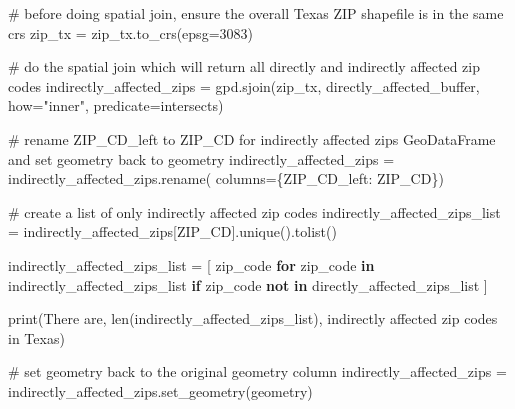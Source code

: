 \documentclass[
  letterpaper,
  DIV=11,
  numbers=noendperiod]{scrartcl}
\newenvironment{Shaded}{\begin{snugshade}}{\end{snugshade}}
\newcommand{\BuiltInTok}[1]{\textcolor[rgb]{0.00,0.23,0.31}{#1}}
\newcommand{\CommentTok}[1]{\textcolor[rgb]{0.37,0.37,0.37}{#1}}
\newcommand{\ControlFlowTok}[1]{\textcolor[rgb]{0.00,0.23,0.31}{\textbf{#1}}}
\newcommand{\DecValTok}[1]{\textcolor[rgb]{0.68,0.00,0.00}{#1}}
\newcommand{\KeywordTok}[1]{\textcolor[rgb]{0.00,0.23,0.31}{\textbf{#1}}}
\newcommand{\NormalTok}[1]{\textcolor[rgb]{0.00,0.23,0.31}{#1}}
\newcommand{\OperatorTok}[1]{\textcolor[rgb]{0.37,0.37,0.37}{#1}}
\newcommand{\StringTok}[1]{\textcolor[rgb]{0.13,0.47,0.30}{#1}}
\begin{document}
\begin{Shaded}
\begin{Highlighting}[]
\CommentTok{\# before doing spatial join, ensure the overall Texas ZIP shapefile is in the same crs}
\NormalTok{zip\_tx }\OperatorTok{=}\NormalTok{ zip\_tx.to\_crs(epsg}\OperatorTok{=}\DecValTok{3083}\NormalTok{)}

\CommentTok{\# do the spatial join which will return all directly and indirectly affected zip codes}
\NormalTok{indirectly\_affected\_zips }\OperatorTok{=}\NormalTok{ gpd.sjoin(zip\_tx, directly\_affected\_buffer,}
\NormalTok{                                     how}\OperatorTok{=}\StringTok{"inner"}\NormalTok{, predicate}\OperatorTok{=}\StringTok{\textquotesingle{}intersects\textquotesingle{}}\NormalTok{)}

\CommentTok{\# rename ZIP\_CD\_left to \textquotesingle{}ZIP\_CD\textquotesingle{} for indirectly affected zips GeoDataFrame and set geometry back to geometry}
\NormalTok{indirectly\_affected\_zips }\OperatorTok{=}\NormalTok{ indirectly\_affected\_zips.rename(}
\NormalTok{    columns}\OperatorTok{=}\NormalTok{\{}\StringTok{\textquotesingle{}ZIP\_CD\_left\textquotesingle{}}\NormalTok{: }\StringTok{\textquotesingle{}ZIP\_CD\textquotesingle{}}\NormalTok{\})}

\CommentTok{\# create a list of only indirectly affected zip codes}
\NormalTok{indirectly\_affected\_zips\_list }\OperatorTok{=}\NormalTok{ indirectly\_affected\_zips[}\StringTok{\textquotesingle{}ZIP\_CD\textquotesingle{}}\NormalTok{].unique().tolist()}

\NormalTok{indirectly\_affected\_zips\_list }\OperatorTok{=}\NormalTok{ [}
\NormalTok{    zip\_code }\ControlFlowTok{for}\NormalTok{ zip\_code }\KeywordTok{in}\NormalTok{ indirectly\_affected\_zips\_list}
    \ControlFlowTok{if}\NormalTok{ zip\_code }\KeywordTok{not} \KeywordTok{in}\NormalTok{ directly\_affected\_zips\_list}
\NormalTok{]}

\BuiltInTok{print}\NormalTok{(}\StringTok{\textquotesingle{}There are\textquotesingle{}}\NormalTok{, }\BuiltInTok{len}\NormalTok{(indirectly\_affected\_zips\_list),}
      \StringTok{\textquotesingle{}indirectly affected zip codes in Texas\textquotesingle{}}\NormalTok{)}

\CommentTok{\# set geometry back to the original geometry column}
\NormalTok{indirectly\_affected\_zips }\OperatorTok{=}\NormalTok{ indirectly\_affected\_zips.set\_geometry(}\StringTok{\textquotesingle{}geometry\textquotesingle{}}\NormalTok{)}
\end{Highlighting}
\end{Shaded}
\end{document}
